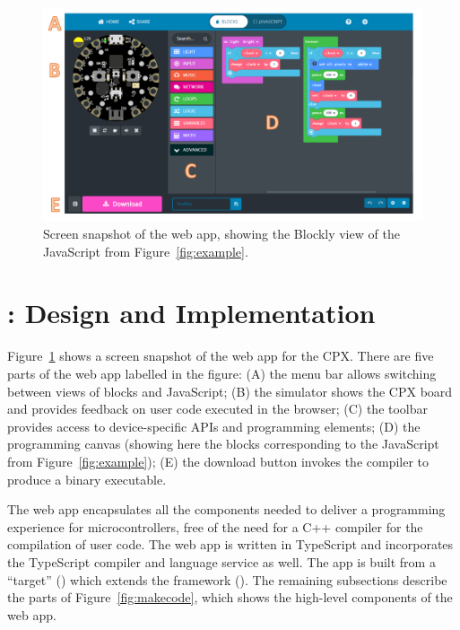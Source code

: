 
\begin{figure}[t]
    \includegraphics[width=6in]{CPXfig.pdf}
\caption{\label{fig:screenSnap}Screen snapshot of the \MC web app, showing the Blockly
view of the JavaScript from Figure~\ref{fig:example}.}
\end{figure}


\section{\MCN: Design and Implementation}
\label{sec:makecode}

Figure~\ref{fig:screenSnap} shows a screen snapshot of the \MC web app for the CPX.
There are five parts of the web app labelled in the figure:
(A) the menu bar allows switching between views of blocks and JavaScript;
(B) the simulator shows the CPX board and provides feedback on user code executed in the browser;
(C) the toolbar provides access to device-specific APIs and programming elements;
(D) the programming canvas (showing here the blocks corresponding to the JavaScript from Figure~\ref{fig:example});
(E) the download button invokes the compiler to produce a binary executable.

The \MC web app encapsulates all the components needed to deliver a programming experience 
for microcontrollers, free of the need for a C++ compiler for the compilation of user code.
The web app is written in TypeScript and incorporates the TypeScript compiler and 
language service as well. 
The app is built from a \MC ``target'' (\emph{})
which extends the \MC framework (\emph{}).
The remaining subsections describe the parts of Figure~\ref{fig:makecode}, 
which shows the high-level components of the web app.

